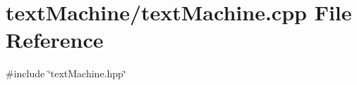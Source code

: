 \section{text\+Machine/text\+Machine.cpp File Reference}
\label{text_machine_8cpp}
{\ttfamily \#include \char`\"{}text\+Machine.\+hpp\char`\"{}}\newline
